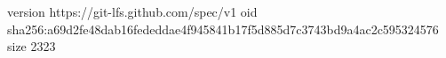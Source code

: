 version https://git-lfs.github.com/spec/v1
oid sha256:a69d2fe48dab16fededdae4f945841b17f5d885d7c3743bd9a4ac2c595324576
size 2323
